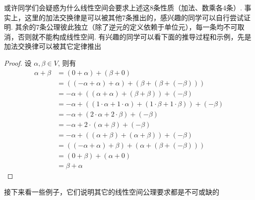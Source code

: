 或许同学们会疑惑为什么线性空间会要求上述这8条性质（加法、数乘各4条）. 事实上，这里的加法交换律是可以被其他7条推出的，感兴趣的同学可以自行尝试证明. 其余的7条公理彼此独立（除了逆元的定义依赖于单位元），每一条均不可取消，否则就不能构成线性空间. 有兴趣的同学可以看下面的推导过程和示例，先是加法交换律可以被其它定律推出

\begin{proof}
{
    \allowdisplaybreaks
    设 $\alpha,\beta\in V$, 则有
    \begin{align*}
        \tag{加法单位元}
        \alpha + \beta &= (0 + \alpha) + (\beta + 0)\\
        \tag{逆元}
        &= ((-\alpha + \alpha) + \alpha) + (\beta + (\beta + (-\beta)))\\
        \tag{加法结合律}
        &= -\alpha + ((\alpha + \alpha) + (\beta + \beta)) + (-\beta)\\
        \tag{乘法单位元}
        &= -\alpha + ((1\cdot\alpha + 1\cdot\alpha) + (1\cdot\beta + 1\cdot\beta)) + (-\beta)\\
        \tag{左分配律}
        &= -\alpha + (2\cdot\alpha + 2\cdot\beta) + (-\beta)\\
        \tag{右分配律}
        &= -\alpha + 2\cdot (\alpha + \beta) + (-\beta)\\
        \tag{左分配律}
        &= -\alpha + ((\alpha + \beta) + (\alpha + \beta)) + (-\beta)\\
        \tag{加法结合律}
        &= ((-\alpha + \alpha) + \beta) + (\alpha + (\beta + (-\beta)))\\
        \tag{逆元}
        &= (0 + \beta) + (\alpha + 0)\\
        \tag{加法单位元}
        &= \beta + \alpha
    \end{align*}
}
\end{proof}

接下来看一些例子，它们说明其它的线性空间公理要求都是不可或缺的

